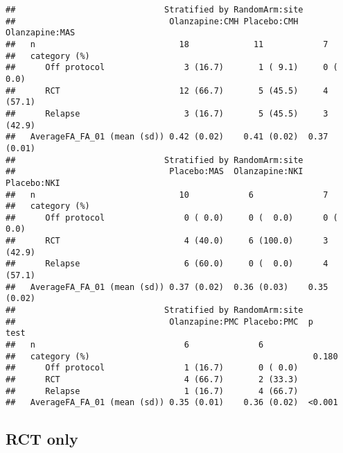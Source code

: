 \documentclass[]{article}
\theoremstyle{definition}
\theoremstyle{definition}
\theoremstyle{definition}
\theoremstyle{remark}
\begin{document}
\begin{verbatim}
##                              Stratified by RandomArm:site
##                               Olanzapine:CMH Placebo:CMH  Olanzapine:MAS
##   n                             18             11            7          
##   category (%)                                                          
##      Off protocol                3 (16.7)       1 ( 9.1)     0 ( 0.0)   
##      RCT                        12 (66.7)       5 (45.5)     4 (57.1)   
##      Relapse                     3 (16.7)       5 (45.5)     3 (42.9)   
##   AverageFA_FA_01 (mean (sd)) 0.42 (0.02)    0.41 (0.02)  0.37 (0.01)   
##                              Stratified by RandomArm:site
##                               Placebo:MAS  Olanzapine:NKI Placebo:NKI 
##   n                             10            6              7        
##   category (%)                                                        
##      Off protocol                0 ( 0.0)     0 (  0.0)      0 ( 0.0) 
##      RCT                         4 (40.0)     6 (100.0)      3 (42.9) 
##      Relapse                     6 (60.0)     0 (  0.0)      4 (57.1) 
##   AverageFA_FA_01 (mean (sd)) 0.37 (0.02)  0.36 (0.03)    0.35 (0.02) 
##                              Stratified by RandomArm:site
##                               Olanzapine:PMC Placebo:PMC  p      test
##   n                              6              6                    
##   category (%)                                             0.180     
##      Off protocol                1 (16.7)       0 ( 0.0)             
##      RCT                         4 (66.7)       2 (33.3)             
##      Relapse                     1 (16.7)       4 (66.7)             
##   AverageFA_FA_01 (mean (sd)) 0.35 (0.01)    0.36 (0.02)  <0.001
\end{verbatim}

\subsection{RCT only}\label{rct-only-2}
\end{document}
